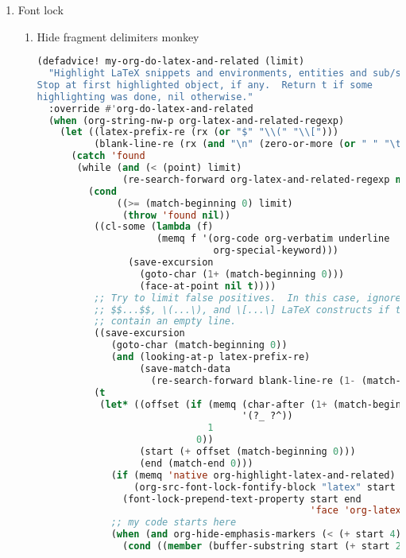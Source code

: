 \documentclass[11pt]{article}
\begin{document}
\begin{enumerate}
  \item Font lock
  \label{sec:font-lock}

  
\begin{enumerate}
  \item Hide fragment delimiters\hfill{} monkey
  \label{sec:hide-fragment-delimiters}

  \begin{lstlisting}[language=Lisp]
(defadvice! my-org-do-latex-and-related (limit)
  "Highlight LaTeX snippets and environments, entities and sub/superscript.
Stop at first highlighted object, if any.  Return t if some
highlighting was done, nil otherwise."
  :override #'org-do-latex-and-related
  (when (org-string-nw-p org-latex-and-related-regexp)
    (let ((latex-prefix-re (rx (or "$" "\\(" "\\[")))
          (blank-line-re (rx (and "\n" (zero-or-more (or " " "\t")) "\n"))))
      (catch 'found
       (while (and (< (point) limit)
               (re-search-forward org-latex-and-related-regexp nil t))
         (cond
              ((>= (match-beginning 0) limit)
               (throw 'found nil))
          ((cl-some (lambda (f)
                     (memq f '(org-code org-verbatim underline
                               org-special-keyword)))
                (save-excursion
                  (goto-char (1+ (match-beginning 0)))
                  (face-at-point nil t))))
          ;; Try to limit false positives.  In this case, ignore
          ;; $$...$$, \(...\), and \[...\] LaTeX constructs if they
          ;; contain an empty line.
          ((save-excursion
             (goto-char (match-beginning 0))
             (and (looking-at-p latex-prefix-re)
                  (save-match-data
                    (re-search-forward blank-line-re (1- (match-end 0)) t)))))
          (t
           (let* ((offset (if (memq (char-after (1+ (match-beginning 0)))
                                    '(?_ ?^))
                              1
                            0))
                  (start (+ offset (match-beginning 0)))
                  (end (match-end 0)))
             (if (memq 'native org-highlight-latex-and-related)
                 (org-src-font-lock-fontify-block "latex" start end)
               (font-lock-prepend-text-property start end
                                                'face 'org-latex-and-related))
             ;; my code starts here
             (when (and org-hide-emphasis-markers (< (+ start 4) end))
               (cond ((member (buffer-substring start (+ start 2)) '("$$" "\\("))

\end{lstlisting}
\end{enumerate}
\end{enumerate}
\end{document}
